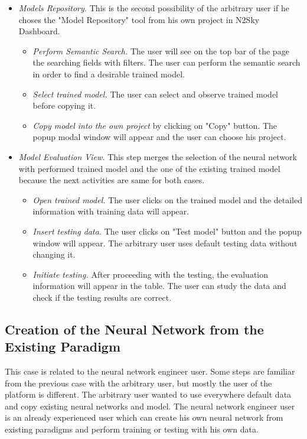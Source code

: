 \begin{itemize}
\item \emph{Models Repository.} This is the second possibility of the arbitrary user if he choses the "Model Repository" tool from his own project in N2Sky Dashboard.
\begin{itemize}
\item \emph{Perform Semantic Search.} The user will see on the top bar of the page the searching fields with filters. The user can perform the semantic search in order to find a desirable trained model.
\item \emph{Select trained model.} The user can select and observe trained model before copying it.
\item \emph{Copy model into the own project} by clicking on "Copy" button. The popup modal window will appear and the user can choose his project.
\end{itemize}

\item \emph{Model Evaluation View.} This step merges the selection of the neural network with performed trained model and the one of the existing trained model because the next activities are same for both cases.
\begin{itemize}
\item \emph{Open trained model.} The user clicks on the trained model and the detailed information with training data will appear.
\item \emph{Insert testing data.} The user clicks on "Test model" button and the popup window will appear. The arbitrary user uses default testing data without changing it.
\item \emph{Initiate testing.} After proceeding with the testing, the evaluation information will appear in the table. The user can study the data and check if the testing results are correct.
\end{itemize}


\end{itemize}



\subsection{Creation of the Neural Network from the Existing Paradigm}\label{Creation of the neural network from the existing paradigm}

This case is related to the neural network engineer user. Some steps are familiar from the previous case with the arbitrary user, but mostly the user of the platform is different. The arbitrary user wanted to use everywhere default data and copy existing neural networks and model. The neural network engineer user is an already experienced user which can create his own neural network from existing paradigms and perform training or testing with his own data.


